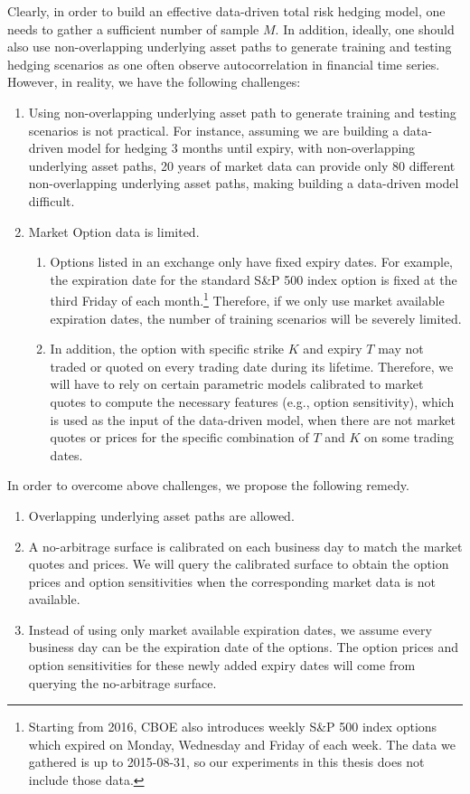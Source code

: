 \documentclass[letterpaper,12pt,titlepage,oneside,final]{book}
\numberwithin{equation}{section}
\theoremstyle{definition}
\begin{document}
Clearly, in order to build an effective data-driven total risk hedging model, one needs to gather a sufficient  number of sample  $M$.  In addition, ideally, one should also use non-overlapping underlying asset paths to generate training and testing hedging scenarios as one often observe autocorrelation in financial time series.  
However, in reality,  we have the following challenges:
\begin{enumerate}
	\item Using non-overlapping underlying asset path to  generate training and testing scenarios is not practical. For instance, assuming we are building a data-driven model for hedging 3 months until expiry, with non-overlapping underlying asset paths, 20 years of market data can provide only 80 different non-overlapping underlying asset paths, making building a data-driven model difficult.
	\item Market Option data  is limited. 
	\begin{enumerate}
		\item Options listed in an exchange only have fixed expiry dates. For example, the expiration date for the standard S\&P 500 index option is fixed at the third Friday of each month.\footnote{Starting from 2016, CBOE also introduces weekly S\&P 500 index options which expired on Monday, Wednesday and Friday of each week. The data we gathered is up to 2015-08-31, so our experiments in this thesis does not include those data.} Therefore, if we only use market available expiration dates, the number of training scenarios will  be severely limited. 
		\item In addition, the option with specific strike $K$ and expiry $T$ may not traded or quoted on every trading date during its lifetime.
		Therefore, we will have to rely on certain parametric models calibrated to market quotes to compute the necessary features (e.g., option sensitivity), which is used as the input of the data-driven model, when there are not market quotes or prices for the specific combination of $T$ and $K$ on some trading dates. 
		

	\end{enumerate}
\end{enumerate}
In order to overcome  above challenges, we propose the following remedy.  
\begin{enumerate}
	\item Overlapping underlying asset paths are allowed.
	\item A no-arbitrage  surface is calibrated on each business day to match the market quotes and prices. We will query the calibrated surface to obtain the option prices and option sensitivities when the corresponding market data is not available. 
	\item Instead of using only market available expiration dates, we assume every business day can be the expiration date of the options. The option prices and option sensitivities for these newly added expiry dates will come from querying the no-arbitrage  surface.
\end{enumerate}
\end{document}
